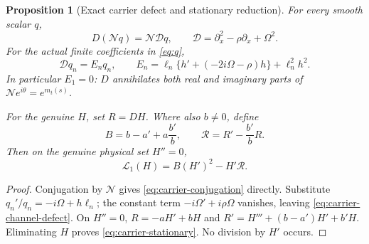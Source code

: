 \documentclass[11pt]{article}
\newtheorem{proposition}[theorem]{Proposition}
\theoremstyle{definition}
\theoremstyle{remark}
\begin{document}
\begin{proposition}[Exact carrier defect and stationary reduction]
\label{prop:carrier-defect}
For every smooth scalar $q$,
\begin{equation}
 D(\mathcal Nq)=\mathcal N\mathcal Dq,\qquad
 \mathcal D=\partial_x^2-\rho\partial_x+\Omega^2.
 \label{eq:carrier-conjugation}
\end{equation}
For the actual finite coefficients in \eqref{eq:q},
\begin{equation}
 \mathcal Dq_n=E_nq_n,\qquad
 E_n=\ell_n\{h'+(-2i\Omega-\rho)h\}+\ell_n^2h^2.
 \label{eq:carrier-channel-defect}
\end{equation}
In particular $E_1=0$: $D$ annihilates both real and imaginary
parts of $\mathcal N e^{i\theta}=e^{m_t(s)}$.

For the genuine $H$, set $R=DH$. Where also $b\ne0$, define
\[
 B=b-a'+a\frac{b'}b,\qquad
 \mathcal R=R'-\frac{b'}bR.
\]
Then on the genuine physical set $H''=0$,
\begin{equation}
 \boxed{\mathscr L_1(H)=B(H')^2-H'\mathcal R.}
 \label{eq:carrier-stationary}
\end{equation}
\end{proposition}
\begin{proof}
Conjugation by $\mathcal N$ gives \eqref{eq:carrier-conjugation}
directly. Substitute $q_n'/q_n=-i\Omega+h\ell_n$; the constant
term $-i\Omega'+i\rho\Omega$ vanishes, leaving
\eqref{eq:carrier-channel-defect}. On $H''=0$,
$R=-aH'+bH$ and
$R'=H'''+(b-a')H'+b'H$. Eliminating $H$ proves
\eqref{eq:carrier-stationary}. No division by $H'$ occurs.
\end{proof}
\end{document}
